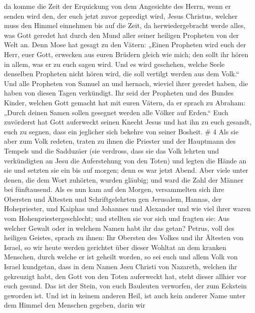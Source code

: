 da komme die Zeit der Erquickung von dem Angesichte des Herrn, wenn er
senden wird den, der euch jetzt zuvor gepredigt wird, Jesus Christus,
 welcher muss den Himmel einnehmen bis auf die Zeit, da
herwiedergebracht werde alles, was Gott geredet hat durch den Mund aller
seiner heiligen Propheten von der Welt an.  Denn Mose hat
gesagt zu den Vätern: „Einen Propheten wird euch der Herr, euer Gott,
erwecken aus euren Brüdern gleich wie mich; den sollt ihr hören in
allem, was er zu euch sagen wird.  Und es wird geschehen,
welche Seele denselben Propheten nicht hören wird, die soll vertilgt
werden aus dem Volk.``  Und alle Propheten von Samuel an
und hernach, wieviel ihrer geredet haben, die haben von diesen Tagen
verkündigt.  Ihr seid der Propheten und des Bundes Kinder,
welchen Gott gemacht hat mit euren Vätern, da er sprach zu Abraham:
„Durch deinen Samen sollen gesegnet werden alle Völker auf Erden.``
 Euch zuvörderst hat Gott auferweckt seinen Knecht Jesus
und hat ihn zu euch gesandt, euch zu segnen, dass ein jeglicher sich
bekehre von seiner Bosheit. \# 4  Als sie aber zum Volk
redeten, traten zu ihnen die Priester und der Hauptmann des Tempels und
die Sadduzäer  (sie verdross, dass sie das Volk lehrten und
verkündigten an Jesu die Auferstehung von den Toten)  und
legten die Hände an sie und setzten sie ein bis auf morgen; denn es war
jetzt Abend.  Aber viele unter denen, die dem Wort zuhörten,
wurden gläubig; und ward die Zahl der Männer bei fünftausend.
 Als es nun kam auf den Morgen, versammelten sich ihre
Obersten und Ältesten und Schriftgelehrten gen Jerusalem, 
Hannas, der Hohepriester, und Kaiphas und Johannes und Alexander und wie
viel ihrer waren vom Hohenpriestergeschlecht;  und stellten
sie vor sich und fragten sie: Aus welcher Gewalt oder in welchem Namen
habt ihr das getan?  Petrus, voll des heiligen Geistes,
sprach zu ihnen: Ihr Obersten des Volkes und ihr Ältesten von Israel,
 so wir heute werden gerichtet über dieser Wohltat an dem
kranken Menschen, durch welche er ist geheilt worden,  so
sei euch und allem Volk von Israel kundgetan, dass in dem Namen Jesu
Christi von Nazareth, welchen ihr gekreuzigt habt, den Gott von den
Toten auferweckt hat, steht dieser allhier vor euch gesund.
 Das ist der Stein, von euch Bauleuten verworfen, der zum
Eckstein geworden ist.  Und ist in keinem anderen Heil, ist
auch kein anderer Name unter dem Himmel den Menschen gegeben, darin wir
